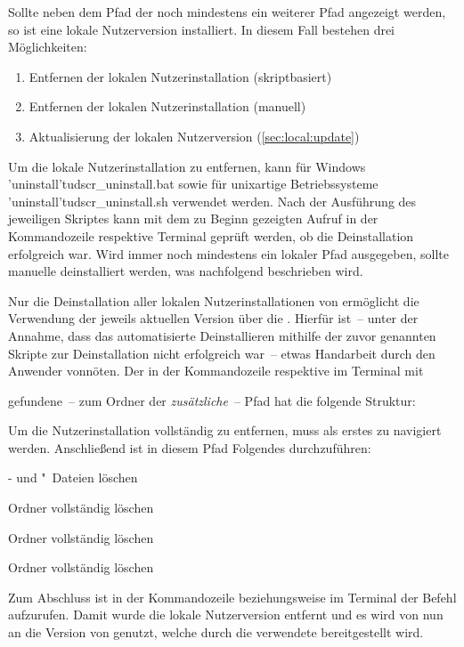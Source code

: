 Sollte neben dem Pfad der \Distro noch mindestens ein weiterer Pfad angezeigt 
werden, so ist eine lokale Nutzerversion installiert. In diesem Fall bestehen
drei Möglichkeiten:
%
\begin{enumerate}
\item Entfernen der lokalen Nutzerinstallation (skriptbasiert)
\item Entfernen der lokalen Nutzerinstallation (manuell)
\item Aktualisierung der lokalen Nutzerversion (\autoref{sec:local:update})
\end{enumerate}
%
Um die lokale Nutzerinstallation zu entfernen, kann für Windows
\GitHubFile*'uninstall'{tudscr_uninstall.bat} sowie für unixartige 
Betriebssysteme \GitHubFile*'uninstall'{tudscr_uninstall.sh} verwendet 
werden. Nach der Ausführung des jeweiligen Skriptes kann mit dem zu Beginn 
gezeigten Aufruf in der Kommandozeile respektive Terminal geprüft werden, ob 
die Deinstallation erfolgreich war. Wird immer noch mindestens ein lokaler Pfad 
ausgegeben, sollte \TUDScript manuelle deinstalliert werden, was nachfolgend 
beschrieben wird.

Nur die Deinstallation aller lokalen Nutzerinstallationen von \TUDScript 
ermöglicht die Verwendung der jeweils aktuellen Version über die \Distro. 
Hierfür ist~-- unter der Annahme, dass das automatisierte Deinstallieren 
mithilfe der zuvor genannten Skripte zur Deinstallation nicht erfolgreich 
war~-- etwas Handarbeit durch den Anwender vonnöten. Der in der Kommandozeile 
respektive im Terminal mit
%
\begin{quoting}
\RET
\end{quoting}
%
gefundene~-- zum Ordner der \Distro \emph{zusätzliche}~-- Pfad hat die folgende 
Struktur:
%
\begin{quoting}
\end{quoting}
%
Um die Nutzerinstallation vollständig zu entfernen, muss als erstes zu 
 navigiert werden. Anschließend ist in diesem 
Pfad Folgendes durchzuführen:
%
\settowidth{}%
\begin{description}[labelwidth=\tudscrdim,labelsep=.5em]
\item[\Path{tex/latex/tudscr/}]- und "~Dateien löschen
\item[\Path{tex/latex/tudscr/}]Ordner  vollständig löschen
\item[\Path{doc/latex/}] Ordner  vollständig löschen
\item[\Path{source/latex/}] Ordner  vollständig löschen
\end{description}
%
Zum Abschluss ist in der Kommandozeile beziehungsweise im Terminal der Befehl 
 aufzurufen. Damit wurde die lokale Nutzerversion entfernt und es 
wird von nun an die Version von \TUDScript genutzt, welche durch die verwendete 
\Distro bereitgestellt wird.



